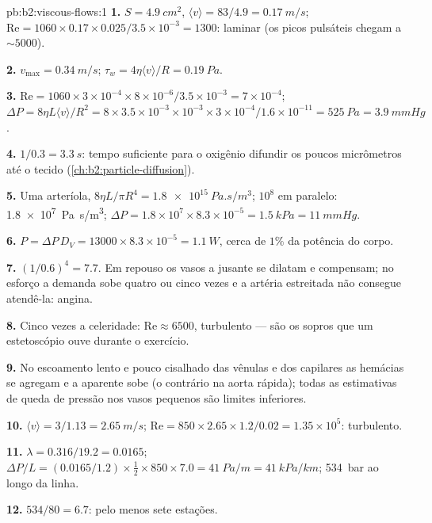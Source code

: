 \begin{solution}{pb:b2:viscous-flows:1}
\textbf{1.} $S = \qty{4.9}{cm^2}$, $\langle v\rangle = 83/4.9 = \qty{0.17}{m/s}$; $\mathrm{Re}
= 1060 \times 0.17 \times 0.025/3.5 \times 10^{-3} = 1300$: laminar (os picos pulsáteis
chegam a $\sim 5000$).

\textbf{2.} $v_{\max} = \qty{0.34}{m/s}$; $\tau_w = 4\eta\langle v\rangle/R = \qty{0.19}{Pa}$.

\textbf{3.} $\mathrm{Re} = 1060 \times 3 \times 10^{-4} \times 8 \times 10^{-6}/3.5 \times 10^{-3} =
7 \times 10^{-4}$; $\Delta P = 8\eta L\langle v\rangle/R^2 = 8 \times 3.5 \times 10^{-3} \times 10^{-3}
\times 3 \times 10^{-4}/1.6 \times 10^{-11} = \qty{525}{Pa} = \qty{3.9}{mmHg}$.

\textbf{4.} $1/0.3 = \qty{3.3}{s}$: tempo suficiente para o oxigênio difundir os poucos
micrômetros até o tecido (\cref{ch:b2:particle-diffusion}).

\textbf{5.} Uma arteríola, $8\eta L/\pi R^4 = \qty{1.8e15}{Pa.s/m^3}$; $10^8$ em
paralelo: \qty{1.8e7}{Pa.s/m^3}; $\Delta P = 1.8 \times 10^7 \times 8.3 \times 10^{-5} =
\qty{1.5}{kPa} = \qty{11}{mmHg}$.

\textbf{6.} $P = \Delta P\,D_V = 13000 \times 8.3 \times 10^{-5} = \qty{1.1}{W}$, cerca de
$1\%$ da potência do corpo.

\textbf{7.} $(1/0.6)^4 = 7.7$. Em repouso os vasos a jusante se dilatam e
compensam; no esforço a demanda sobe quatro ou cinco vezes e a
artéria estreitada não consegue atendê-la: angina.

\textbf{8.} Cinco vezes a celeridade: $\mathrm{Re} \approx 6500$, turbulento --- são os
sopros que um estetoscópio ouve durante o exercício.

\textbf{9.} No escoamento lento e pouco cisalhado das vênulas e dos capilares
as hemácias se agregam e a  aparente sobe (o contrário
na aorta rápida); todas as estimativas de queda de pressão nos vasos pequenos
são limites inferiores.

\textbf{10.} $\langle v\rangle = 3/1.13 = \qty{2.65}{m/s}$; $\mathrm{Re} = 850 \times 2.65 \times
1.2/0.02 = 1.35 \times 10^5$: turbulento.

\textbf{11.} $\lambda = 0.316/19.2 = 0.0165$; $\Delta P/L = (0.0165/1.2) \times \tfrac12 \times
850 \times 7.0 = \qty{41}{Pa/m} = \qty{41}{kPa/km}$; \qty{534}{bar} ao longo da linha.

\textbf{12.} $534/80 = 6.7$: pelo menos sete estações.


\end{solution}
